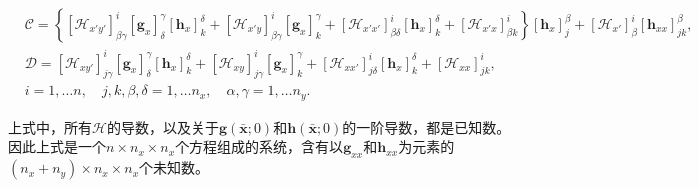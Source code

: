 \begin{equation*}
\begin{split}
&    \mathcal{C} = \left\{
    \left[\mathcal{H}_{x'y'}\right]^{i}_{\beta \gamma}
    \left[\bm{g}_{x}\right]^{\gamma}_{\delta}
    \left[\bm{h}_{x}\right]^{\delta}_{k}
    + \left[\mathcal{H}_{x'y}\right]^{i}_{\beta \gamma}
    \left[\bm{g}_{x}\right]^{\gamma}_{k}
    + \left[\mathcal{H}_{x'x'}\right]^{i}_{\beta \delta}
    \left[\bm{h}_{x}\right]^{\delta}_{k}
    + \left[\mathcal{H}_{x'x}\right]^{i}_{\beta k}
     \right\}
     \left[ \bm{h}_{x} \right]^{\beta}_{j}
     + \left[\mathcal{H}_{x'}\right]^{i}_{\beta}
     \left[\bm{h}_{xx}\right]^{\beta}_{j k},\\
&    \mathcal{D}=
    \left[\mathcal{H}_{xy'}\right]^{i}_{j \gamma}
    \left[\bm{g}_{x}\right]^{\gamma}_{\delta}
    \left[\bm{h}_{x}\right]^{\delta}_{k}
    + \left[\mathcal{H}_{xy}\right]^{i}_{j \gamma}
    \left[\bm{g}_{x}\right]^{\gamma}_{k}
    + \left[\mathcal{H}_{xx'}\right]^{i}_{j \delta}
    \left[\bm{h}_{x}\right]^{\delta}_{k}
    + \left[\mathcal{H}_{xx}\right]^{i}_{j k},
    \\&i=1,\ldots n, \quad j,k,\beta,\delta = 1, \ldots n_x, \quad \alpha, \gamma = 1, \ldots n_y.
  \end{split}
\end{equation*}

上式中，所有$\mathcal{H}$的导数，以及关于$\bm{g}(\bar{\bm{x}};0)$和$\bm{h}(\bar{\bm{x}};0)$的一阶导数，都是已知数。因此上式是一个$n \times n_{x} \times n_{x}$个方程组成的系统，含有以$\bm{g}_{xx}$和$\bm{h}_{xx}$为元素的$(n_{x}+n_y)\times n_x \times n_x$个未知数。

